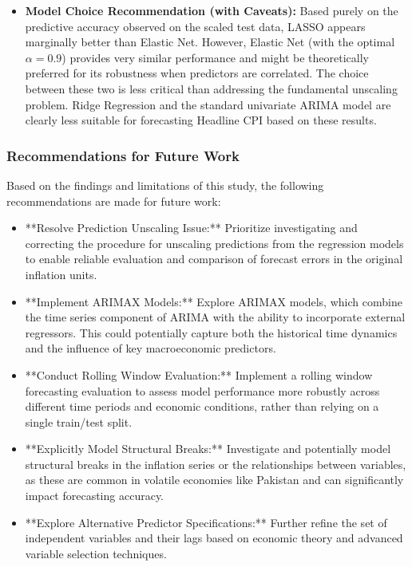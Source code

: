 \documentclass[12pt,a4paper]{article}
\begin{document}
\begin{itemize}
    \item \textbf{Model Choice Recommendation (with Caveats):} Based purely on the predictive accuracy observed on the scaled test data, LASSO appears marginally better than Elastic Net. However, Elastic Net (with the optimal $\alpha=0.9$) provides very similar performance and might be theoretically preferred for its robustness when predictors are correlated. The choice between these two is less critical than addressing the fundamental unscaling problem. Ridge Regression and the standard univariate ARIMA model are clearly less suitable for forecasting Headline CPI based on these results.
\end{itemize}

\subsubsection{Recommendations for Future Work}
Based on the findings and limitations of this study, the following recommendations are made for future work:
\begin{itemize}
    \item **Resolve Prediction Unscaling Issue:** Prioritize investigating and correcting the procedure for unscaling predictions from the regression models to enable reliable evaluation and comparison of forecast errors in the original inflation units.
    \item **Implement ARIMAX Models:** Explore ARIMAX models, which combine the time series component of ARIMA with the ability to incorporate external regressors. This could potentially capture both the historical time dynamics and the influence of key macroeconomic predictors.
    \item **Conduct Rolling Window Evaluation:** Implement a rolling window forecasting evaluation to assess model performance more robustly across different time periods and economic conditions, rather than relying on a single train/test split.
    \item **Explicitly Model Structural Breaks:** Investigate and potentially model structural breaks in the inflation series or the relationships between variables, as these are common in volatile economies like Pakistan and can significantly impact forecasting accuracy.
    \item **Explore Alternative Predictor Specifications:** Further refine the set of independent variables and their lags based on economic theory and advanced variable selection techniques.
\end{itemize}
\end{document}
